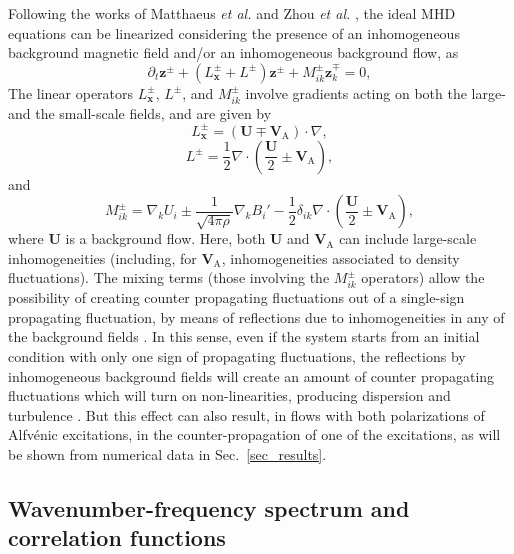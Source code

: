 \documentclass[aip,pop,reprint,amsmath,amssymb,floatfix]{revtex4-1}
\renewcommand{\vec}[1]{\mathbf{#1}}
\begin{document}
Following the works of Matthaeus {\it et al.} \cite{matthaeus1994transport} and Zhou {\it et al.} \cite{zhou1990remarks}, the ideal MHD equations can be linearized considering the presence of an inhomogeneous background magnetic field and/or an inhomogeneous background flow, as
\begin{equation}\label{eq:MHD_zpzm}
  \partial_t \vec{z}^\pm
  + \left( L^\pm_\vec{x} + L^\pm \right) \vec{z}^\pm
  + M^\pm_{ik} \vec{z}^\mp_k
  = 0,
\end{equation}
The linear operators $L^\pm_\vec{x}$, $L^\pm$, and $M^\pm_{ik}$ involve gradients acting on both the large- and the small-scale fields, and are given by
\begin{equation}\label{eq:MHD_Lx}
  L^\pm_\vec{x} = \left( \vec{U} \mp \vec{V}_\textrm{A} \right) \cdot \nabla ,
\end{equation}
\begin{equation}\label{eq:MHD_L}
  L^\pm = \frac{1}{2} \nabla \cdot \left( \frac{\vec{U}}{2} \pm \vec{V}_\textrm{A} 
  \right) ,
\end{equation}
and
\begin{equation}\label{eq:MHD_Mik}
  M^\pm_{ik} = \nabla_k U_i \pm \frac{1}{\sqrt{4\pi\rho}} \nabla_k B_i'
  - \frac{1}{2} \delta_{ik} \nabla\cdot \left( \frac{\vec{U}}{2} \pm
  \vec{V}_\textrm{A} \right) ,
\end{equation}
where $\vec{U}$ is a background flow. Here, both $\vec{U}$ and $\vec{V}_\textrm{A}$ can include large-scale inhomogeneities (including, for $\vec{V}_\textrm{A}$, inhomogeneities associated to density fluctuations). The mixing terms (those involving the $M_{ik}^\pm$ operators) allow the possibility of creating counter propagating fluctuations out of a single-sign propagating fluctuation, by means of reflections due to inhomogeneities in any of the background fields \cite{velli_1993_propagation}. In this sense, even if the system starts from an initial condition with only one sign of propagating fluctuations, the reflections by inhomogeneous background fields will create an amount of counter propagating fluctuations which will turn on non-linearities, producing dispersion and turbulence \cite{matthaeus_1999_coronal, dmitruk_2001_coronal}. But this effect can also result, in flows with both polarizations of Alfv\'enic excitations, in the counter-propagation of one of the excitations, as will be shown from numerical data in Sec.~\ref{sec_results}.

\subsection{Wavenumber-frequency spectrum and correlation functions}\label{sec_Wfspectrum_and_Gamma}
\end{document}
